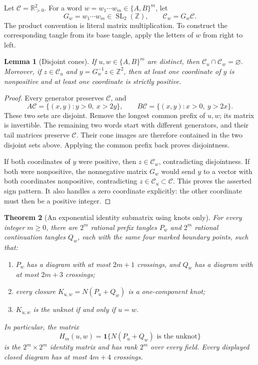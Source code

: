\documentclass[11pt,a4paper]{article}
\newtheorem{theorem}{Theorem}[section]
\newtheorem{lemma}[theorem]{Lemma}
\theoremstyle{definition}
\theoremstyle{remark}
\numberwithin{equation}{section}
\begin{document}
Let $\mathcal C=\mathbb R_{>0}^{2}$.  For a word
$w=w_1\cdots w_m\in\{A,B\}^m$, let
\[
 G_w=w_1\cdots w_m\in\operatorname{SL}_2(\mathbb Z),
 \qquad \mathcal C_w=G_w\mathcal C.
\]
The product convention is literal matrix multiplication.  To construct
the corresponding tangle from its base tangle, apply the letters of $w$
from right to left.

\begin{lemma}[Disjoint cones]
\label{lem:rational-disjoint-cones}
If $u,w\in\{A,B\}^m$ are distinct, then
$\mathcal C_u\cap\mathcal C_w=\varnothing$.
Moreover, if $z\in\mathcal C_u$ and
$y=G_w^{-1}z\in\mathbb Z^2$, then at least one coordinate of $y$ is
nonpositive and at least one coordinate is strictly positive.
\end{lemma}

\begin{proof}
Every generator preserves $\mathcal C$, and
\[
 A\mathcal C=\{(x,y):y>0,\ x>2y\},\qquad
 B\mathcal C=\{(x,y):x>0,\ y>2x\}.
\]
These two sets are disjoint.  Remove the longest common prefix of $u,w$;
its matrix is invertible.  The remaining two words start with different
generators, and their tail matrices preserve $\mathcal C$.  Their cone
images are therefore contained in the two disjoint sets above.  Applying
the common prefix back proves disjointness.

If both coordinates of $y$ were positive, then $z\in\mathcal C_w$,
contradicting disjointness.  If both were nonpositive, the nonnegative
matrix $G_w$ would send $y$ to a vector with both coordinates nonpositive,
contradicting $z\in\mathcal C_u\subset\mathcal C$.  This proves the
asserted sign pattern.  It also handles a zero coordinate explicitly:
the other coordinate must then be a positive integer.
\end{proof}

\begin{theorem}[An exponential identity submatrix using knots only]
\label{thm:rational-boolean-identity}
For every integer $m\ge0$, there are $2^m$ rational prefix tangles $P_w$
and $2^m$ rational continuation tangles $Q_w$, each with the same four
marked boundary points, such that:
\begin{enumerate}
 \item $P_w$ has a diagram with at most $2m+1$ crossings, and $Q_w$
       has a diagram with at most $2m+3$ crossings;
 \item every closure $K_{u,w}=N(P_u+Q_w)$ is a one-component knot;
 \item $K_{u,w}$ is the unknot if and only if $u=w$.
\end{enumerate}
In particular, the matrix
\[
 H_m(u,w)=\mathbf 1\{N(P_u+Q_w)\text{ is the unknot}\}
\]
is the $2^m\times2^m$ identity matrix and has rank $2^m$ over every field.
Every displayed closed diagram has at most $4m+4$ crossings.
\end{theorem}
\end{document}
